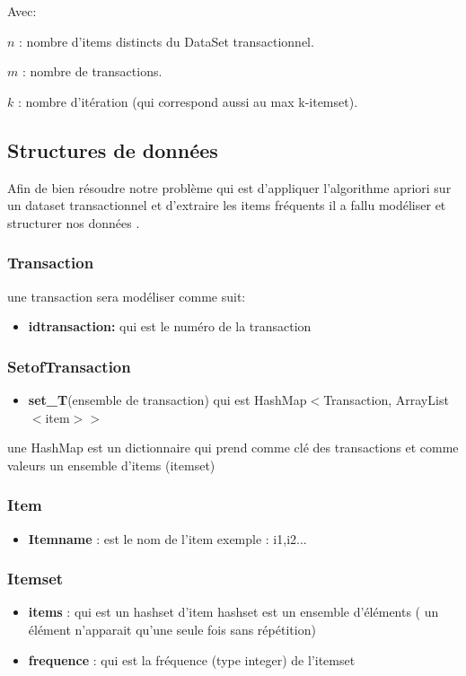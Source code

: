 \documentclass[12pt,a4paper,oneside]{book}
\begin{document}
		Avec: 
		
		$n$ : nombre d'items distincts du DataSet transactionnel.
		
		$m$ : nombre de transactions.
		
		
		$k$ : nombre d'itération (qui correspond aussi au max k-itemset).	
	
	
	\subsection{Structures de données}
	Afin de bien résoudre notre problème qui est d'appliquer l'algorithme apriori sur un dataset transactionnel et d'extraire les items fréquents il a fallu modéliser et structurer nos données .
	
	\subsubsection{Transaction}
	une transaction sera modéliser comme suit:
	\begin{itemize}
		\item  \textbf{idtransaction:} qui est le numéro de la transaction
	\end{itemize}
	\subsubsection{SetofTransaction}
	\begin{itemize}
		\item  \textbf{set\_T}(ensemble de transaction) qui est HashMap$<$Transaction, ArrayList$<$item$>>$
	\end{itemize}
	une HashMap est un dictionnaire qui prend comme clé des  transactions et comme valeurs un ensemble d'items (itemset)
	
	\subsubsection{Item}
	\begin{itemize}
		\item \textbf{Itemname} :  est le nom de l'item exemple : i1,i2...
		
	\end{itemize}
	\subsubsection{Itemset}
	\begin{itemize}
		\item \textbf{ items} : qui est un hashset d'item hashset est un ensemble d'éléments ( un élément n'apparait qu'une seule fois sans répétition)
		\item\textbf{ frequence} : qui est la fréquence (type integer) de l'itemset
	\end{itemize}
\end{document}
